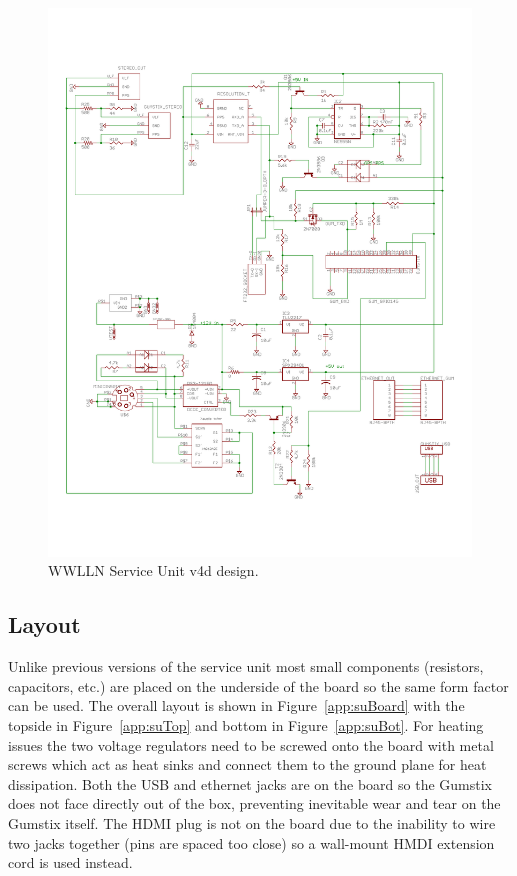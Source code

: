 \begin{figure}[ht!]
   \centering
   \includegraphics[scale=.75]{Appendix/Figures/wwlln_SU_v4_Schematic.pdf} 
   \caption{WWLLN Service Unit v4d design.}
   \label{app:suSchematic}
\end{figure}

\subsection{Layout}

Unlike previous versions of the service unit most small components (resistors, capacitors, etc.) are placed on the underside of the board so the same form factor can be used.
The overall layout is shown in Figure~\ref{app:suBoard} with the topside in Figure~\ref{app:suTop} and bottom in Figure~\ref{app:suBot}.
For heating issues the two voltage regulators need to be screwed onto the board with metal screws which act as heat sinks and connect them to the ground plane for heat dissipation.
Both the USB and ethernet jacks are on the board so the Gumstix does not face directly out of the box, preventing inevitable wear and tear on the Gumstix itself.
The HDMI plug is not on the board due to the inability to wire two jacks together (pins are spaced too close) so a wall-mount HMDI extension cord is used instead.

